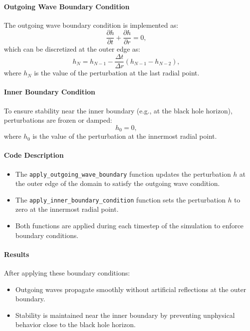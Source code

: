 \documentclass[12pt]{article}
\begin{document}
\paragraph{Outgoing Wave Boundary Condition}
The outgoing wave boundary condition is implemented as:
\[
\frac{\partial h}{\partial t} + \frac{\partial h}{\partial r} = 0,
\]
which can be discretized at the outer edge as:
\[
h_{N} = h_{N-1} - \frac{\Delta t}{\Delta r}(h_{N-1} - h_{N-2}),
\]
where $h_{N}$ is the value of the perturbation at the last radial point.

\paragraph{Inner Boundary Condition}
To ensure stability near the inner boundary (e.g., at the black hole horizon), perturbations are frozen or damped:
\[
h_{0} = 0,
\]
where $h_{0}$ is the value of the perturbation at the innermost radial point.

\paragraph{Code Description}
\begin{itemize}
    \item The \texttt{apply\_outgoing\_wave\_boundary} function updates the perturbation $h$ at the outer edge of the domain to satisfy the outgoing wave condition.
    \item The \texttt{apply\_inner\_boundary\_condition} function sets the perturbation $h$ to zero at the innermost radial point.
    \item Both functions are applied during each timestep of the simulation to enforce boundary conditions.
\end{itemize}

\paragraph{Results}
After applying these boundary conditions:
\begin{itemize}
    \item Outgoing waves propagate smoothly without artificial reflections at the outer boundary.
    \item Stability is maintained near the inner boundary by preventing unphysical behavior close to the black hole horizon.
\end{itemize}
\end{document}
